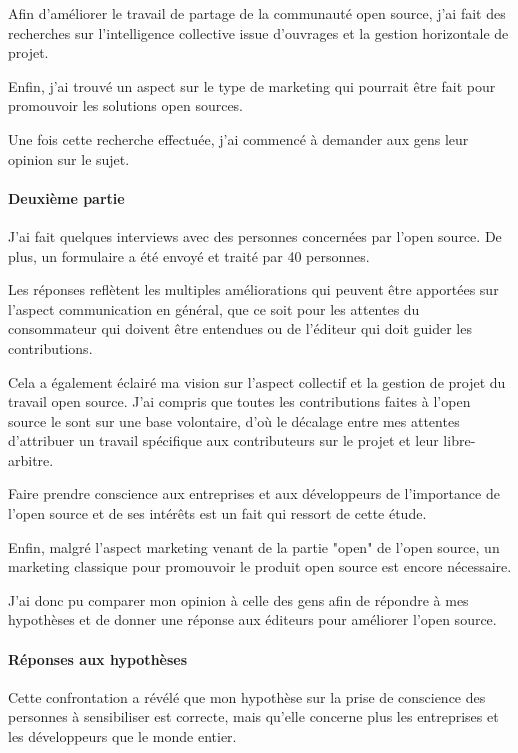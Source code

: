 	Afin d'améliorer le travail de partage de la communauté open source, j'ai fait des recherches sur l'intelligence collective issue d'ouvrages et la gestion horizontale de projet.

	Enfin, j'ai trouvé un aspect sur le type de marketing qui pourrait être fait pour promouvoir les solutions open sources.

	Une fois cette recherche effectuée, j'ai commencé à demander aux gens leur opinion sur le sujet.

	\paragraph*{Deuxième partie\\}

	J'ai fait quelques interviews avec des personnes concernées par l'open source. De plus, un formulaire a été envoyé et traité par 40 personnes.

	Les réponses reflètent les multiples améliorations qui peuvent être apportées sur l'aspect communication en général, que ce soit pour les attentes du consommateur qui doivent être entendues ou de l'éditeur qui doit guider les contributions.

	Cela a également éclairé ma vision sur l'aspect collectif et la gestion de projet du travail open source. J'ai compris que toutes les contributions faites à l'open source le sont sur une base volontaire, d'où le décalage entre mes attentes d'attribuer un travail spécifique aux contributeurs sur le projet et leur libre-arbitre.

	Faire prendre conscience aux entreprises et aux développeurs de l'importance de l'open source et de ses intérêts est un fait qui ressort de cette étude.

	Enfin, malgré l'aspect marketing venant de la partie "open" de l'open source, un marketing classique pour promouvoir le produit open source est encore nécessaire.

	J'ai donc pu comparer mon opinion à celle des gens afin de répondre à mes hypothèses et de donner une réponse aux éditeurs pour améliorer l'open source.

	\paragraph*{Réponses aux hypothèses\\}

	Cette confrontation a révélé que mon hypothèse sur la prise de conscience des personnes à sensibiliser est correcte, mais qu'elle concerne plus les entreprises et les développeurs que le monde entier.

